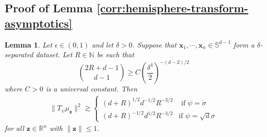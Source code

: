 \documentclass{article}
\newtheorem{lemma}[theorem]{Lemma}
\theoremstyle{definition}
\newcommand*{\R}{\mathbb{R}}
\renewcommand{\S}{\mathbb{S}}
\def\vx{{\bm{x}}}
\def\vz{{\bm{z}}}
\begin{document}
\subsection{Proof of Lemma \ref{corr:hemisphere-transform-asymptotics}} \label{app:hemi-transform-asymp}
\begin{lemma}\label{lemma:hemisphere-transform-asymptotics-implicit}
    Let $\epsilon \in (0, 1)$ and let $\delta > 0$. Suppose that $\vx_1, \cdots, \vx_n \in \S^{d - 1}$ form a $\delta$-separated dataset. Let $R \in \mathbb{N}$ be such that
    \[\binom{2R + d - 1}{d - 1} \geq C\left(\frac{\delta^4}{2}\right)^{-(d - 2)/2} \]
    where $C > 0$ is a universal constant. Then
    \begin{align*}
        \|T_{\psi}\mu_{\vz}\|^2 \gtrsim \begin{cases}
            (d + R)^{1/2}d^{-1/2} R^{-3/2} & \text{ if $\psi = \dot{\sigma}$}\\
            (d + R)^{-1/2}d^{1/2}R^{-3/2} & \text{if $\psi = \sqrt{d}\sigma$}
        \end{cases} 
    \end{align*}
    for all $\vz \in \R^n$ with $\|\vz\| \leq 1$.
\end{lemma}
\end{document}
